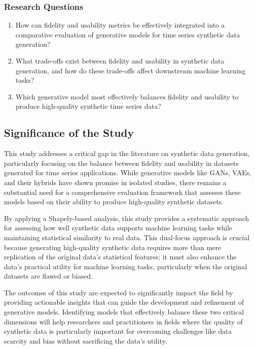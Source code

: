 \documentclass{article}
\begin{document}
\subsubsection{Research Questions}
\begin{enumerate}
    \item How can fidelity and usability metrics be effectively integrated into a comparative evaluation of generative models for time series synthetic data generation?
    \item What trade-offs exist between fidelity and usability in synthetic data generation, and how do these trade-offs affect downstream machine learning tasks?
    \item Which generative model most effectively balances fidelity and usability to produce high-quality synthetic time series data?
\end{enumerate}

\subsection{Significance of the Study}
This study addresses a critical gap in the literature on synthetic data generation, particularly focusing on the balance between fidelity and usability in datasets generated for time series applications. While generative models like GANs, VAEs, and their hybrids have shown promise in isolated studies, there remains a substantial need for a comprehensive evaluation framework that assesses these models based on their ability to produce high-quality synthetic datasets.

By applying a Shapely-based analysis, this study provides a systematic approach for assessing how well synthetic data supports machine learning tasks while maintaining statistical similarity to real data. This dual-focus approach is crucial because generating high-quality synthetic data requires more than mere replication of the original data’s statistical features; it must also enhance the data's practical utility for machine learning tasks, particularly when the original datasets are flawed or biased.

The outcomes of this study are expected to significantly impact the field by providing actionable insights that can guide the development and refinement of generative models. Identifying models that effectively balance these two critical dimensions will help researchers and practitioners in fields where the quality of synthetic data is particularly important for overcoming challenges like data scarcity and bias without sacrificing the data’s utility.
\end{document}
